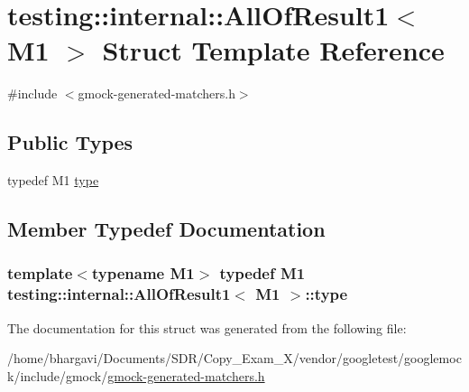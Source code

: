 \hypertarget{structtesting_1_1internal_1_1_all_of_result1}{}\section{testing\+:\+:internal\+:\+:All\+Of\+Result1$<$ M1 $>$ Struct Template Reference}
\label{structtesting_1_1internal_1_1_all_of_result1}


{\ttfamily \#include $<$gmock-\/generated-\/matchers.\+h$>$}

\subsection*{Public Types}
\begin{DoxyCompactItemize}
\item 
typedef M1 \hyperlink{structtesting_1_1internal_1_1_all_of_result1_a19b95d4ddf7f4044a78665d9e253db10}{type}
\end{DoxyCompactItemize}


\subsection{Member Typedef Documentation}
\subsubsection[{\texorpdfstring{type}{type}}]{\setlength{\rightskip}{0pt plus 5cm}template$<$typename M1$>$ typedef M1 {\bf testing\+::internal\+::\+All\+Of\+Result1}$<$ M1 $>$\+::{\bf type}}\hypertarget{structtesting_1_1internal_1_1_all_of_result1_a19b95d4ddf7f4044a78665d9e253db10}{}\label{structtesting_1_1internal_1_1_all_of_result1_a19b95d4ddf7f4044a78665d9e253db10}


The documentation for this struct was generated from the following file\+:\begin{DoxyCompactItemize}
\item 
/home/bhargavi/\+Documents/\+S\+D\+R/\+Copy\+\_\+\+Exam\+\_\+X/vendor/googletest/googlemock/include/gmock/\hyperlink{gmock-generated-matchers_8h}{gmock-\/generated-\/matchers.\+h}\end{DoxyCompactItemize}
